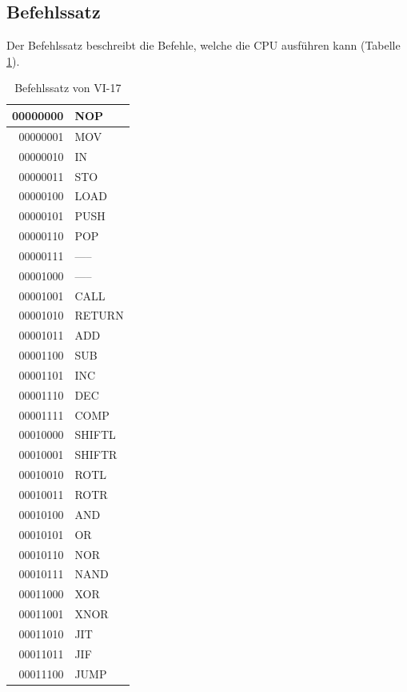 \documentclass[a4paper,12pt]{article}
\begin{document}
\subsection{Befehlssatz}

Der Befehlssatz beschreibt die Befehle, welche die CPU ausführen kann (Tabelle \ref{tab:befehlssatz}).
\newpage
\begin{table}[!htb]
\centering
\begin{tabular}{|r|l|}
  \hline
  00000000 & NOP \\
  \hline
  00000001 & MOV\\ 
  \hline
  00000010 & IN\\
  \hline
  00000011 & STO\\
  \hline
  00000100 & LOAD\\
  \hline
  00000101 & PUSH \\ 
  \hline
  00000110 & POP\\
  \hline
  00000111 & -----\\
 \hline
  00001000 & ----- \\
  \hline
  00001001 & CALL\\ 
  \hline
  00001010 & RETURN\\
  \hline
  00001011 & ADD\\
  \hline 
 00001100 & SUB \\
  \hline
  00001101 & INC\\ 
  \hline
  00001110 & DEC\\
  \hline
  00001111 & COMP\\
  \hline
  00010000 & SHIFTL\\
  \hline
  00010001 & SHIFTR\\ 
  \hline
  00010010 & ROTL\\
  \hline
  00010011 & ROTR\\
  \hline
  00010100 & AND\\
  \hline
  00010101 & OR \\ 
  \hline
  00010110 & NOR\\
  \hline
  00010111 & NAND\\
  \hline
  00011000 & XOR\\
  \hline
  00011001 & XNOR \\
  \hline
  00011010 & JIT\\
  \hline
  00011011 & JIF\\
  \hline
  00011100 & JUMP\\
  \hline
\end{tabular}
\caption{Befehlssatz von VI-17}
\label{tab:befehlssatz}
\end{table}
\end{document}
